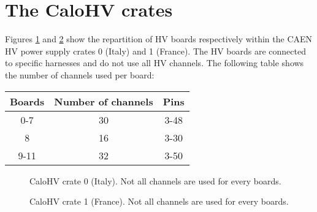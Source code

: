 
\clearpage
\section{The CaloHV crates}

Figures  \ref{fig:calohv:crates:0} and  \ref{fig:calohv:crates:1} show
 the repartition  of HV boards  respectively within the CAEN  HV power
 supply crates 0 (Italy) and 1 (France). The HV boards are connected to
 specific harnesses and do not use all HV channels. The following table
 shows the number of channels used per board:
 \vskip 5pt
 \begin{center}
 \begin{tabular}{|c|c|c|}
 \hline
 Boards & Number of channels & Pins\\
 \hline
 \hline
 0-7    & 30 & 3-48\\
 \hline
 8      & 16 & 3-30\\
 \hline
 9-11   & 32 & 3-50\\
 \hline
 \end{tabular}
 \end{center}
 

\begin{figure}[h!]
  \begin{center}
    \scalebox{0.6}{}
  \end{center}
  \caption{CaloHV crate 0 (Italy). Not all channels are used for every boards.}
  \label{fig:calohv:crates:0}
\end{figure}

\begin{figure}[h!]
  \begin{center}
    \scalebox{0.6}{}
  \end{center}
  \caption{CaloHV crate 1 (France). Not all channels are used for every boards.}
  \label{fig:calohv:crates:1}
\end{figure}

